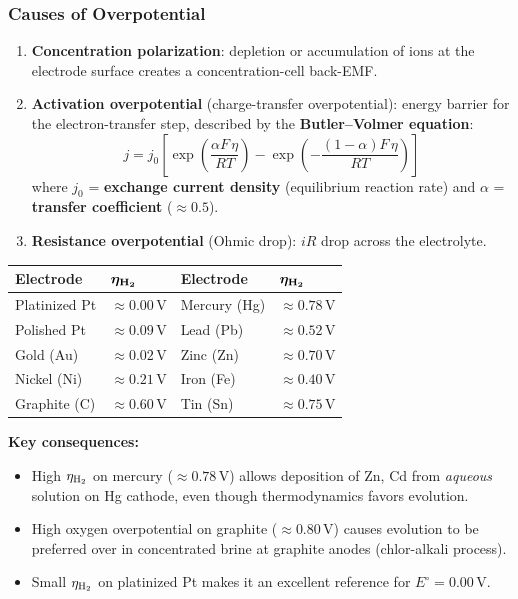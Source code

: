\subsubsection{Causes of Overpotential}
\begin{enumerate}
    \item \textbf{Concentration polarization}: depletion or accumulation of ions at the electrode surface creates a concentration-cell back-EMF.
    \item \textbf{Activation overpotential} (charge-transfer overpotential): energy barrier for the electron-transfer step, described by the \textbf{Butler--Volmer equation}:
    \begin{equation}
        j = j_0 \left[\exp\!\left(\frac{\alpha F\,\eta}{RT}\right) - \exp\!\left(-\frac{(1-\alpha)F\,\eta}{RT}\right)\right]
    \end{equation}
    where $j_0$ = \textbf{exchange current density} (equilibrium reaction rate) and $\alpha$ = \textbf{transfer coefficient} ($\approx 0.5$).
    \item \textbf{Resistance overpotential} (Ohmic drop): $iR$ drop across the electrolyte.
\end{enumerate}

\begin{atkinsbox}
\begin{center}
\begin{tabular}{ll@{\quad\quad}ll}
\toprule
\textbf{Electrode} & $\boldsymbol{\eta_{\ce{H2}}}$ & \textbf{Electrode} & $\boldsymbol{\eta_{\ce{H2}}}$\\
\midrule
Platinized Pt & $\approx 0.00\,\text{V}$ & Mercury (Hg) & $\approx 0.78\,\text{V}$\\
Polished Pt & $\approx 0.09\,\text{V}$ & Lead (Pb) & $\approx 0.52\,\text{V}$\\
Gold (Au) & $\approx 0.02\,\text{V}$ & Zinc (Zn) & $\approx 0.70\,\text{V}$\\
Nickel (Ni) & $\approx 0.21\,\text{V}$ & Iron (Fe) & $\approx 0.40\,\text{V}$\\
Graphite (C) & $\approx 0.60\,\text{V}$ & Tin (Sn) & $\approx 0.75\,\text{V}$\\
\bottomrule
\end{tabular}
\end{center}
\textbf{Key consequences:}
\begin{itemize}
    \item High $\eta_{\ce{H2}}$ on mercury ($\approx 0.78\,\text{V}$) allows deposition of Zn, Cd from \textit{aqueous} solution on Hg cathode, even though thermodynamics favors  evolution.
    \item High oxygen overpotential on graphite ($\approx 0.80\,\text{V}$) causes  evolution to be preferred over  in concentrated brine at graphite anodes (chlor-alkali process).
    \item Small $\eta_{\ce{H2}}$ on platinized Pt makes it an excellent reference for $E^\circ = 0.00\,\text{V}$.
\end{itemize}
\end{atkinsbox}

